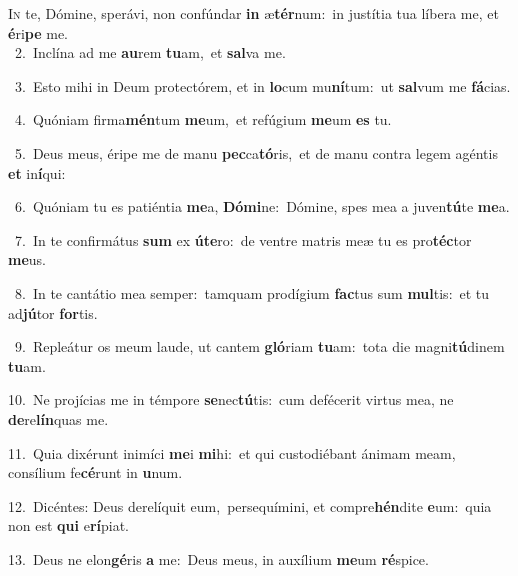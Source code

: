 \lettrine{\initial\textcolor{\initialcolor}{I}}{n} te, Dómine, sperávi, non confúndar \textbf{in} æ\-\textbf{tér}\-num:~\star in justítia tua líbera me, et \textbf{é}\-ri\textbf{pe} me.\\
{\numbfont\textcolor{\numbcolor}{~2.}}~Inclína ad me \textbf{au}\-rem \textbf{tu}\-am,~\star et \textbf{sal}\-va me.\par
{\numbfont\textcolor{\numbcolor}{~3.}}~Esto mihi in Deum protectórem, et in \textbf{lo}\-cum mu\-\textbf{ní}\-tum:~\star ut \textbf{sal}\-vum me \textbf{fá}\-cias.\par
{\numbfont\textcolor{\numbcolor}{~4.}}~Quóniam firma\-\textbf{mén}\-tum \textbf{me}\-um,~\star et refúgium \textbf{me}\-um \textbf{es} tu.\par
{\numbfont\textcolor{\numbcolor}{~5.}}~Deus meus, éripe me de manu \textbf{pec}\-ca\-\textbf{tó}\-ris,~\star et de manu contra legem agéntis \textbf{et} in\-\textbf{í}\-qui:\par
{\numbfont\textcolor{\numbcolor}{~6.}}~Quóniam tu es patiéntia \textbf{me}\-a, \textbf{Dó}\-\textbf{mi}ne:~\star Dómine, spes mea a juven\-\textbf{tú}\-te \textbf{me}\-a.\par
{\numbfont\textcolor{\numbcolor}{~7.}}~In te confirmátus \textbf{sum} ex \textbf{ú}\-\textbf{te}ro:~\star de ventre matris meæ tu es pro\-\textbf{téc}\-tor \textbf{me}\-us.\par
{\numbfont\textcolor{\numbcolor}{~8.}}~In te cantátio mea semper:~\dagger tamquam prodígium \textbf{fac}\-tus sum \textbf{mul}\-tis:~\star et tu ad\-\textbf{jú}\-tor \textbf{for}\-tis.\par
{\numbfont\textcolor{\numbcolor}{~9.}}~Repleátur os meum laude, ut cantem \textbf{gló}\-riam \textbf{tu}\-am:~\star tota die magni\-\textbf{tú}\-dinem \textbf{tu}\-am.\par
{\numbfont\textcolor{\numbcolor}{10.}}~Ne projícias me in témpore \textbf{se}\-nec\-\textbf{tú}\-tis:~\star cum defécerit virtus mea, ne \textbf{de}\-re\-\textbf{lín}\-quas me.\par
{\numbfont\textcolor{\numbcolor}{11.}}~Quia dixérunt inimíci \textbf{me}\-i \textbf{mi}\-hi:~\star et qui custodiébant ánimam meam, consílium fe\-\textbf{cé}\-runt in \textbf{u}\-num.\par
{\numbfont\textcolor{\numbcolor}{12.}}~Dicéntes: Deus derelíquit eum,~\dagger persequímini, et compre\-\textbf{hén}\-dite \textbf{e}\-um:~\star quia non est \textbf{qui} e\-\textbf{rí}\-piat.\par
{\numbfont\textcolor{\numbcolor}{13.}}~Deus ne elon\-\textbf{gé}\-ris \textbf{a} me:~\star Deus meus, in auxílium \textbf{me}\-um \textbf{ré}\-spice.\par
